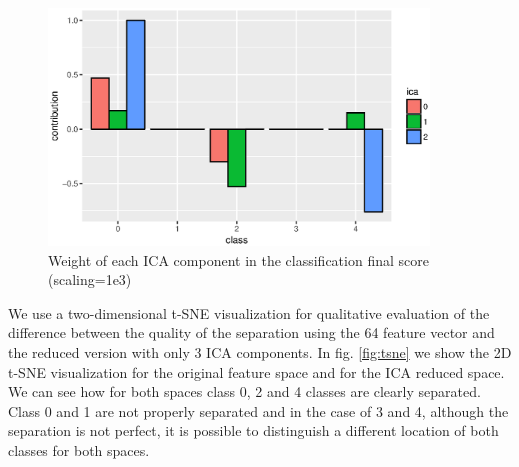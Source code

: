 \documentclass[review]{elsarticle}
\theoremstyle{definition} %
\theoremstyle{remark}
\begin{document}
\begin{figure}[h]
	\centering	
	\includegraphics[width=0.90\textwidth]{./figures/ica_class_contribution.eps}
	\caption{Weight of each ICA component in the classification final score (scaling=1e3)}
	\label{fig:ica_contribution}
\end{figure}

We use a two-dimensional t-SNE visualization \cite{maaten2008visualizing} for qualitative evaluation of the difference between the quality of the separation using the 64 feature vector and the reduced version with only 3 ICA components. In fig. \ref{fig:tsne} we show the 2D t-SNE visualization for the original feature space and for the ICA reduced space. We can see how for both spaces class 0, 2 and 4 classes are clearly separated. Class 0 and 1 are not properly separated and in the case of 3 and 4, although the separation is not perfect, it is possible to distinguish a different location of both classes for both spaces. 
\end{document}

